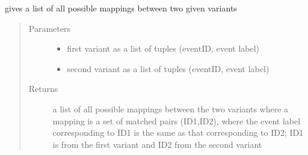 \documentclass[letterpaper,10pt,english]{sphinxmanual}
\begin{document}
\begin{fulllineitems}
\label{\detokenize{cost function:costFunction.mappings.possibleMappings}}
gives a list of all possible mappings between two given variants
\begin{quote}\begin{description}
\item[{Parameters}] \leavevmode\begin{itemize}
\item {} 
 \textendash{} first variant as a list of tuples (eventID, event label)

\item {} 
 \textendash{} second variant as a list of tuples (eventID, event label)

\end{itemize}

\item[{Returns}] \leavevmode
a list of all possible mappings between the two variants where a mapping is a set of matched pairs (ID1,ID2), where the event label corresponding to ID1 is the same as that corresponding to ID2; ID1 is from the first variant and ID2 from the second variant

\end{description}\end{quote}

\end{fulllineitems}

\end{document}

